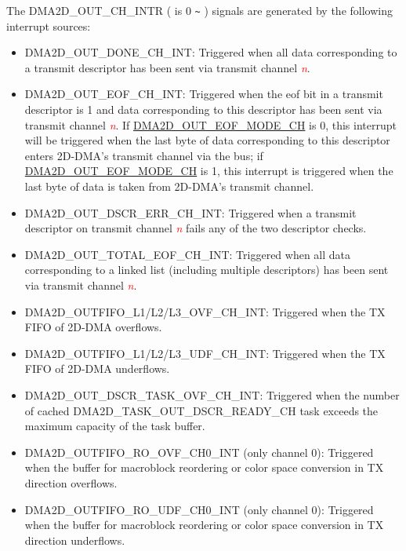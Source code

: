\documentclass[main\_\_EN.tex]{subfiles}
\begin{document}
The DMA2D\_OUT\_CH\_INTR ( is 0 \verb+~+ ) signals are generated by the following interrupt sources:

\begin{itemize}
    \item \label{int:DMA2DOUTDONEINT}DMA2D\_OUT\_DONE\_CH\_INT: Triggered when all data corresponding to a transmit descriptor has been sent via transmit channel \textcolor{red}{\it{n}}.
    \item \label{int:DMA2DOUTEOFINT}DMA2D\_OUT\_EOF\_CH\_INT: Triggered when the eof bit in a transmit descriptor is 1 and data corresponding to this descriptor has been sent via transmit channel \textcolor{red}{\it{n}}. If \hyperref[fielddesc:DMA2DOUTEOFMODECHN]{DMA2D\_OUT\_EOF\_MODE\_CH} is 0, this interrupt will be triggered when the last byte of data corresponding to this descriptor enters 2D-DMA's transmit channel via the bus; if \hyperref[fielddesc:DMA2DOUTEOFMODECHN]{DMA2D\_OUT\_EOF\_MODE\_CH} is 1, this interrupt is triggered when the last byte of data is taken from 2D-DMA's transmit channel.
    \item \label{int:DMA2DOUTDSCRERRINT}DMA2D\_OUT\_DSCR\_ERR\_CH\_INT: Triggered when a transmit descriptor on transmit channel \textcolor{red}{\it{n}} fails any of the two descriptor checks.
    \item \label{int:DMA2DOUTTOTALEOFINT}DMA2D\_OUT\_TOTAL\_EOF\_CH\_INT: Triggered when all data corresponding to a linked list (including multiple descriptors) has been sent via transmit channel \textcolor{red}{\it{n}}.
    \item \label{int:DMA2DOUTFIFOOVFINT}DMA2D\_OUTFIFO\_L1/L2/L3\_OVF\_CH\_INT: Triggered when the TX FIFO of 2D-DMA overflows.
    \item \label{int:DMA2DOUTFIFOUDFINT}DMA2D\_OUTFIFO\_L1/L2/L3\_UDF\_CH\_INT: Triggered when the TX FIFO of 2D-DMA underflows.
    \item \label{int:DMA2DOUTDSCRTASKOVFINT} DMA2D\_OUT\_DSCR\_TASK\_OVF\_CH\_INT: Triggered when the number of cached DMA2D\_TASK\_OUT\_DSCR\_READY\_CH task exceeds the maximum capacity of the task buffer.
    \item \label{int:DMA2DOUTFIFOROOVFINT} DMA2D\_OUTFIFO\_RO\_OVF\_CH0\_INT (only channel 0): Triggered when the buffer for macroblock reordering or color space conversion in TX direction overflows.
    \item \label{int:DMA2DOUTFIFOROUDFINT} DMA2D\_OUTFIFO\_RO\_UDF\_CH0\_INT (only channel 0): Triggered when the buffer for macroblock reordering or color space conversion in TX direction underflows.
\end{itemize}
\end{document}
